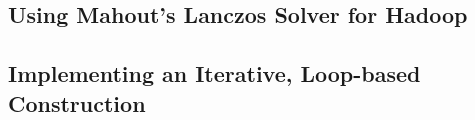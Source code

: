 
\subsection{Using Mahout's Lanczos Solver for Hadoop}

\subsection{Implementing an Iterative, Loop-based Construction}


